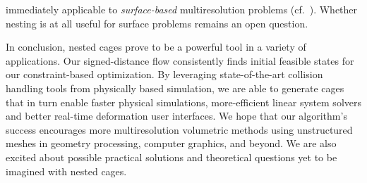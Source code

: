 immediately applicable to \emph{surface-based} multiresolution problems
(cf.\ \cite{Aksoylu2005msu,Chuang:2009:ELO}). Whether nesting is at all useful
for surface problems remains an open question.

In conclusion, nested cages prove to be a powerful tool in a variety of
applications. 
%
Our signed-distance flow consistently finds initial feasible states for our
constraint-based optimization.
%
By leveraging state-of-the-art collision handling tools from physically based
simulation, we are able to generate cages that in turn enable faster physical
simulations, more-efficient linear system solvers and better real-time
deformation user interfaces.
%
We hope that our algorithm's success encourages more multiresolution volumetric
methods using unstructured meshes in geometry processing, computer graphics,
and beyond.
%
We are also excited about possible practical solutions and theoretical
questions yet to be imagined with nested cages.
